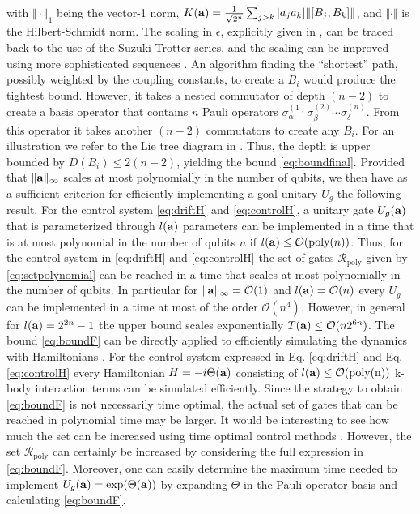 \documentclass[aps,twocolumn,amsmath,amssymb,nofootinbib,superscriptaddress]{revtex4-1}
\begin{document}
with $\Vert\cdot\Vert_{1}$ being the vector-1 norm, $K(\bold{a})=\frac{1}{\sqrt{2^{n}}}\sum_{j>k}|a_{j}a_{k}|\Vert[B_{j},B_{k}]\Vert$, and $\Vert\cdot\Vert$ is the Hilbert-Schmidt norm. The  scaling in $\epsilon$, explicitly given in \cite{OnlineMaterial}, can be traced back to the use of the Suzuki-Trotter series, and the scaling can be improved using more sophisticated sequences \cite{SopSequence}. An algorithm finding the ``shortest'' path, possibly weighted by the coupling constants, to create a $B_{i}$ would produce the tightest bound.  However, it takes a nested commutator of depth $(n-2)$ to create a basis operator that contains $n$ Pauli operators $\sigma_{\alpha}^{(1)}\sigma_{\beta}^{(2)}\cdots\sigma_{\delta}^{(n)}$. From this operator it takes another $(n-2)$ commutators to create any $B_{i}$. For an illustration we refer to the Lie tree diagram in \cite{OnlineMaterial}. Thus, the depth is upper bounded by $D(B_{i})\leq 2(n-2)$, yielding the bound \eqref{eq:boundfinal}. Provided that $\Vert\bold{a}\Vert_{\infty}$ scales at most polynomially in the number of qubits, we then have as a sufficient criterion for efficiently implementing a goal unitary $U_{g}$ the following result. For the control system \eqref{eq:driftH} and \eqref{eq:controlH}, a unitary gate $U_{g}(\bold{a})$ that is parameterized through $l(\bold{a})$ parameters can be implemented in a time that is at most polynomial in the number of qubits $n$ if $l(\bold{a})\leq \mathcal O(\text{poly}(n))$. Thus, for the control system in  \eqref{eq:driftH} and \eqref{eq:controlH} the set of gates $\mathcal R_{\text{poly}}$ given by \eqref{eq:setpolynomial} can be reached in a time that scales at most polynomially in the number of qubits. In particular for $\Vert\bold{a}\Vert_{\infty}=\mathcal O(1)$ and $l(\bold{a})=\mathcal O(n)$ every $U_{g}$ can be implemented in a time at most of the order $\mathcal O(n^{4})$. However, in general for $l(\bold{a})=2^{2n}-1$ the upper bound scales exponentially $T(\bold{a})\leq \mathcal O(n2^{6n})$. The bound \eqref{eq:boundF} can be directly applied to efficiently simulating the dynamics with Hamiltonians \cite{HamSim1, HamSim2, HamSim3}. For the control system expressed in Eq. \eqref{eq:driftH} and Eq. \eqref{eq:controlH} every Hamiltonian $H=-i\Theta(\bold{a})$ consisting of $l(\bold{a})\leq \mathcal O(\text{poly(n)})$ k-body interaction terms can be simulated efficiently. Since the strategy to obtain \eqref{eq:boundF} is not necessarily time optimal, the actual set of gates that can be reached in polynomial time may be larger.  It would be interesting to see how much the set can be increased using time optimal control methods \cite{TimeOptimalC}. However, the set $\mathcal R_{\text{poly}}$ can certainly be increased  by considering the full expression in \eqref{eq:boundF}. Moreover, one can easily determine the maximum time needed to implement $U_{g}(\bold{a})=\exp(\Theta(\bold{a}))$ by expanding $\Theta$ in the Pauli operator basis and calculating \eqref{eq:boundF}. 
 
\end{document}
